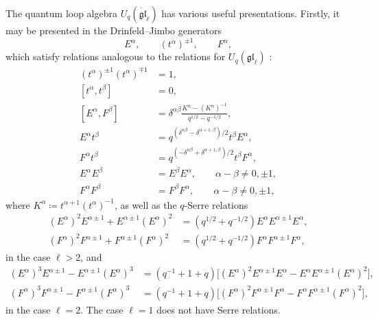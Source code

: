 The quantum loop algebra $U_q(\dot{\mathfrak{gl}}_\ell)$ has various useful presentations. Firstly, it may be presented in the Drinfeld--Jimbo generators
\begin{equation}
    E^\alpha, \qquad (t^\alpha)^{\pm 1}, \qquad F^\alpha,
\end{equation}
which satisfy relations analogous to the relations for $U_q(\mathfrak{gl}_\ell)$ \cite{finkelberg_shifted_2019}:
\begin{align}
    (t^\alpha)^{\pm 1} (t^\alpha)^{\mp 1} &= 1, \label{eq:DJrel1} \\[5pt]
    [t^\alpha,t^\beta] &= 0, \\
    [E^\alpha,F^\beta] &= \delta^{\alpha\beta} \frac{K^\alpha-(K^\alpha)^{-1}}{q^{1/2}-q^{-1/2}}, \\
    E^\alpha t^\beta &= q^{(\delta^{\alpha\beta}-\delta^{\alpha+1,\beta})/2} t^\beta E^\alpha, \\[5pt]
    F^\alpha t^\beta &= q^{(-\delta^{\alpha\beta}+\delta^{\alpha+1,\beta})/2} t^\beta F^\alpha, \\[5pt]
    E^\alpha E^\beta &= E^\beta E^\alpha, \qquad \alpha-\beta \neq 0,\pm1, \\[5pt]
    F^\alpha F^\beta &= F^\beta F^\alpha, \qquad \alpha-\beta \neq 0,\pm1,
\end{align}
where $K^\alpha \coloneq t^{\alpha+1} (t^\alpha)^{-1}$, as well as the $q$-Serre relations 
\begin{align}
    (E^\alpha)^2 E^{\alpha\pm1} + E^{\alpha\pm1} (E^\alpha)^2 &= (q^{1/2}+q^{-1/2}) E^\alpha E^{\alpha\pm1} E^\alpha, \\[5pt]
    (F^\alpha)^2 F^{\alpha\pm1} + F^{\alpha\pm1} (F^\alpha)^2 &= (q^{1/2}+q^{-1/2}) F^\alpha F^{\alpha\pm1} F^\alpha,
\end{align}
in the case $\ell > 2$, and
\begin{align}
    (E^\alpha)^3 E^{\alpha\pm1} - E^{\alpha\pm1} (E^\alpha)^3 &= (q^{-1} + 1 + q) \Big[ (E^\alpha)^2 E^{\alpha\pm1} E^\alpha - E^\alpha E^{\alpha\pm1} (E^\alpha)^2 \Big], \\[5pt]
    (F^\alpha)^3 F^{\alpha\pm1} - F^{\alpha\pm1} (F^\alpha)^3 &= (q^{-1} + 1 + q) \Big[ (F^\alpha)^2 F^{\alpha\pm1} F^\alpha - F^\alpha F^{\alpha\pm1} (F^\alpha)^2 \Big], \label{eq:DJrel2}
\end{align}
in the case $\ell = 2$. The case $\ell=1$ does not have Serre relations.

